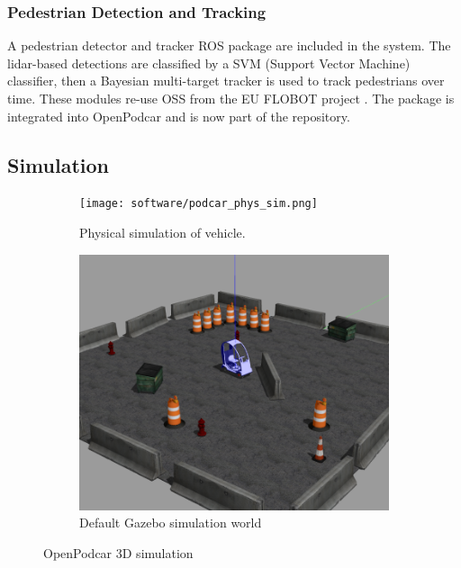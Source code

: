 \documentclass[a4paper]{article}
\begin{document}
	\subsubsection{Pedestrian Detection and Tracking}
	
	A pedestrian detector and tracker ROS package are included in the system.  The lidar-based detections are classified by a SVM (Support Vector Machine) classifier, then a Bayesian multi-target tracker is used to track pedestrians over time. These modules re-use OSS from the EU FLOBOT project \cite{yan2020robot}. The package is integrated into OpenPodcar and is now part of the repository.
	
	
	\subsection{Simulation}
	
	\begin{figure}
		\centering
		\begin{subfigure}{0.45\textwidth}
			\centering
			\texttt{[image: software/podcar\_phys\_sim.png]}
			\caption{Physical simulation of vehicle.}
			\label{fig:physSim}
		\end{subfigure}	
		\quad
		\begin{subfigure}{0.45\textwidth}
			\centering
			\includegraphics[width=0.9\columnwidth]{figs_sim/podcar_loaded_gazebo.png}
			\caption{Default Gazebo simulation world}
			\label{fig:sim_world}
		\end{subfigure}
		\caption{OpenPodcar 3D simulation}
	\end{figure}
	
\end{document}
